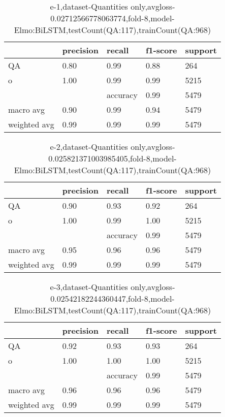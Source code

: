 \begin{table}[!ht] 
\centering
\caption{e-1,dataset-Quantities only,avgloss-0.02712566778063774,fold-8,model-Elmo:BiLSTM,testCount(QA:117),trainCount(QA:968)}\label{e-1data-quantS.tsv}
\begin{tabularx}{300pt}{|X|X|X|X|X|}
\hline
&precision&recall&f1-score&support\\
\hline
QA&0.80&0.99&0.88&264\\
\hline
o&1.00&0.99&0.99&5215\\
\hline
&&accuracy&0.99&5479\\
\hline
macro avg&0.90&0.99&0.94&5479\\
\hline
weighted avg&0.99&0.99&0.99&5479\\
\hline
\end{tabularx}
\end{table}
\begin{table}[!ht] 
\centering
\caption{e-2,dataset-Quantities only,avgloss-0.025821371003985405,fold-8,model-Elmo:BiLSTM,testCount(QA:117),trainCount(QA:968)}\label{e-2data-quantS.tsv}
\begin{tabularx}{300pt}{|X|X|X|X|X|}
\hline
&precision&recall&f1-score&support\\
\hline
QA&0.90&0.93&0.92&264\\
\hline
o&1.00&0.99&1.00&5215\\
\hline
&&accuracy&0.99&5479\\
\hline
macro avg&0.95&0.96&0.96&5479\\
\hline
weighted avg&0.99&0.99&0.99&5479\\
\hline
\end{tabularx}
\end{table}
\begin{table}[!ht] 
\centering
\caption{e-3,dataset-Quantities only,avgloss-0.02542182244360447,fold-8,model-Elmo:BiLSTM,testCount(QA:117),trainCount(QA:968)}\label{e-3data-quantS.tsv}
\begin{tabularx}{300pt}{|X|X|X|X|X|}
\hline
&precision&recall&f1-score&support\\
\hline
QA&0.92&0.93&0.93&264\\
\hline
o&1.00&1.00&1.00&5215\\
\hline
&&accuracy&0.99&5479\\
\hline
macro avg&0.96&0.96&0.96&5479\\
\hline
weighted avg&0.99&0.99&0.99&5479\\
\hline
\end{tabularx}
\end{table}
